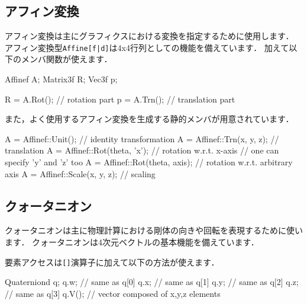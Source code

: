\subsection*{アフィン変換}


\KLUDGE アフィン変換は主にグラフィクスにおける変換を指定するために使用します．
\KLUDGE アフィン変換型\texttt{Affine[f|d]}は4x4行列としての機能を備えています．
\KLUDGE 加えて以下のメンバ関数が使えます．
\begin{sourcecode}
Affinef A;
Matrix3f R;
Vec3f p;

R = A.Rot();           // rotation part
p = A.Trn();           // translation part
\end{sourcecode}

\KLUDGE また，よく使用するアフィン変換を生成する静的メンバが用意されています．
\begin{sourcecode}
A = Affinef::Unit();            // identity transformation
A = Affinef::Trn(x, y, z);      // translation
A = Affinef::Rot(theta, 'x');   // rotation w.r.t. x-axis
                                // one can specify 'y' and 'z' too
A = Affinef::Rot(theta, axis);  // rotation w.r.t. arbitrary axis
A = Affinef::Scale(x, y, z);    // scaling
\end{sourcecode}

\subsection*{クォータニオン}


\KLUDGE クォータニオンは主に物理計算における剛体の向きや回転を表現するために使います．
\KLUDGE クォータニオンは4次元ベクトルの基本機能を備えています．

\KLUDGE 要素アクセスは\texttt{[]}演算子に加えて以下の方法が使えます．
\begin{sourcecode}
Quaterniond q;
q.w;                   // same as q[0]
q.x;                   // same as q[1]
q.y;                   // same as q[2]
q.z;                   // same as q[3]
q.V();                 // vector composed of x,y,z elements
\end{sourcecode}

